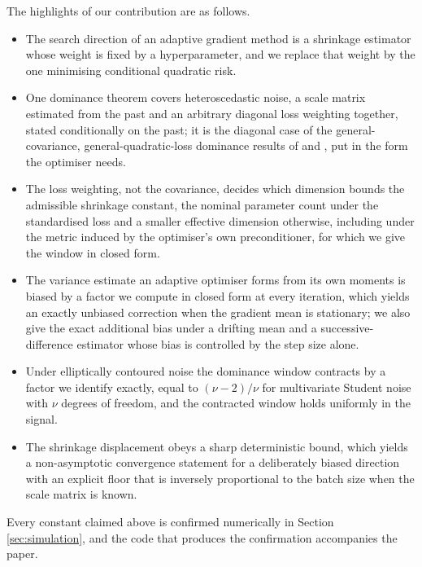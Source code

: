 \documentclass[a4paper,fleqn]{cas-sc}
\theoremstyle{plain}
\theoremstyle{definition}
\theoremstyle{remark}
\newcommand{\rev}[1]{#1}
\begin{document}
The highlights of our contribution are as follows. 
\begin{itemize}

\item The search direction of an adaptive gradient method is a shrinkage estimator whose weight is fixed by a hyperparameter, and we replace that weight by the one minimising conditional quadratic risk.

\item One dominance theorem covers heteroscedastic noise, a scale matrix estimated from the past and an arbitrary diagonal loss weighting together\rev{, stated conditionally on the past; it is the diagonal case of the general-covariance, general-quadratic-loss dominance results of \citet{bock1975} and \citet{berger1976jmva}, put in the form the optimiser needs.}

\item The loss weighting, not the covariance, decides which dimension bounds the admissible shrinkage constant, the nominal parameter count under the standardised loss and a smaller effective dimension otherwise\rev{, including under the metric induced by the optimiser's own preconditioner, for which we give the window in closed form.}

\item The variance estimate an adaptive optimiser forms from its own moments is biased by a factor we compute in closed form at every iteration, which yields an exactly unbiased correction\rev{ when the gradient mean is stationary; we also give the exact additional bias under a drifting mean and a successive-difference estimator whose bias is controlled by the step size alone.}

\item Under elliptically contoured noise the dominance window contracts by a factor we identify exactly, equal to $(\nu-2)/\nu$ for multivariate Student noise with $\nu$ degrees of freedom\rev{, and the contracted window holds uniformly in the signal.}

\item The shrinkage displacement obeys a sharp deterministic bound, which yields a non-asymptotic convergence statement for a deliberately biased direction with an explicit floor that is inversely proportional to the batch size\rev{ when the scale matrix is known.}

\end{itemize}

Every constant claimed above is confirmed numerically in Section \ref{sec:simulation}, and the code that produces the confirmation accompanies the paper.
\end{document}
